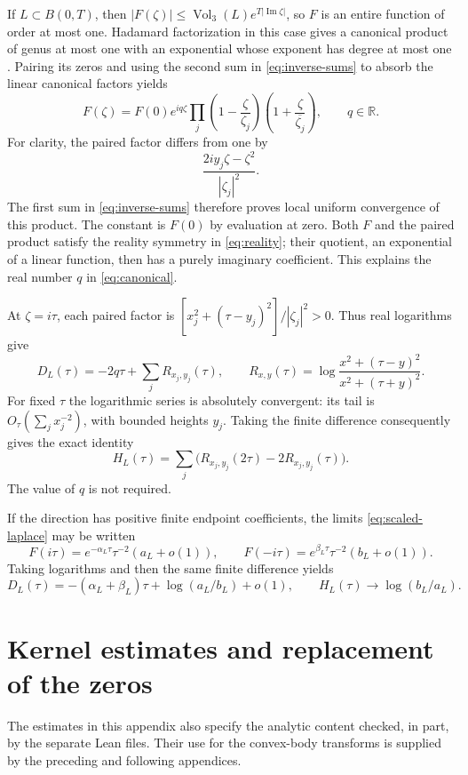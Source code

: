 \documentclass[11pt,a4paper]{article}
\theoremstyle{definition}
\theoremstyle{remark}
\newcommand{\R}{\mathbb R}
\newcommand{\vol}{\operatorname{Vol}_3}
\DeclareMathOperator{\Ima}{Im}
\numberwithin{equation}{section}
\begin{document}
If $L\subset B(0,T)$, then
$|F(\zeta)|\le\vol(L)e^{T|\Ima\zeta|}$, so $F$ is an entire
function of order at most one. Hadamard factorization in this case
gives a canonical product of genus at most one with an exponential
whose exponent has degree at most one \cite[p.~4]{Siu}.
Pairing its zeros and using the second sum in \eqref{eq:inverse-sums}
to absorb the linear canonical factors yields
\begin{equation}\label{eq:canonical}
 F(\zeta)=F(0)e^{iq\zeta}
 \prod_j\left(1-\frac{\zeta}{\zeta_j}\right)
        \left(1+\frac{\zeta}{\overline{\zeta_j}}\right),
 \qquad q\in\R .
\end{equation}
For clarity, the paired factor differs from one by
\[
 \frac{2iy_j\zeta-\zeta^2}{|\zeta_j|^2}.
\]
The first sum in \eqref{eq:inverse-sums} therefore proves local uniform
convergence of this product. The constant is $F(0)$ by evaluation at
zero. Both $F$ and the paired product satisfy the reality symmetry
in \eqref{eq:reality}; their quotient, an exponential of a linear
function, then has a purely imaginary coefficient. This explains
the real number $q$ in \eqref{eq:canonical}.

At $\zeta=i\tau$, each paired factor is
$[x_j^2+(\tau-y_j)^2]/|\zeta_j|^2>0$.
Thus real logarithms give
\begin{equation}\label{eq:Dseries}
 D_L(\tau)=-2q\tau+\sum_j R_{x_j,y_j}(\tau),\qquad
 R_{x,y}(\tau)=\log\frac{x^2+(\tau-y)^2}{x^2+(\tau+y)^2}.
\end{equation}
For fixed $\tau$ the logarithmic series is absolutely convergent:
its tail is $O_\tau(\sum_jx_j^{-2})$, with bounded heights $y_j$.
Taking the finite difference consequently gives the exact identity
\begin{equation}\label{eq:Hseries}
 H_L(\tau)=\sum_j\bigl(R_{x_j,y_j}(2\tau)-2R_{x_j,y_j}(\tau)\bigr).
\end{equation}
The value of $q$ is not required.

If the direction has positive finite endpoint coefficients, the
limits \eqref{eq:scaled-laplace} may be written
\[
 F(i\tau)=e^{-\alpha_L\tau}\tau^{-2}(a_L+o(1)),\qquad
 F(-i\tau)=e^{\beta_L\tau}\tau^{-2}(b_L+o(1)).
\]
Taking logarithms and then the same finite difference yields
\begin{equation}\label{eq:Hlimit}
 D_L(\tau)=-(\alpha_L+\beta_L)\tau+\log(a_L/b_L)+o(1),
 \qquad H_L(\tau)\longrightarrow\log(b_L/a_L).
\end{equation}

\section{Kernel estimates and replacement of the zeros}\label{app:kernels}
The estimates in this appendix also specify the analytic content checked,
in part, by the separate Lean files. Their use for the convex-body
transforms is supplied by the preceding and following appendices.
\end{document}
